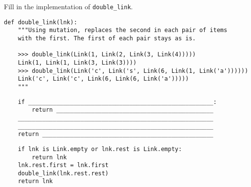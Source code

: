 \begin{blocksection}
\question Fill in the implementation of \lstinline$double_link$.

\begin{lstlisting}
def double_link(lnk):
    """Using mutation, replaces the second in each pair of items
    with the first. The first of each pair stays as is.

    >>> double_link(Link(1, Link(2, Link(3, Link(4)))))
    Link(1, Link(1, Link(3, Link(3))))
    >>> double_link(Link('c', Link('s', Link(6, Link(1, Link('a'))))))
    Link('c', Link('c', Link(6, Link(6, Link('a')))))
    """
\end{lstlisting}

\ifprintanswers\else
\begin{lstlisting}
    if _____________________________________________________:
        return _____________________________________________
    ________________________________________________________
    ________________________________________________________
    return _________________________________________________
\end{lstlisting}
\fi

\begin{solution}
\begin{lstlisting}
    if lnk is Link.empty or lnk.rest is Link.empty:
        return lnk
    lnk.rest.first = lnk.first
    double_link(lnk.rest.rest)
    return lnk
\end{lstlisting}
\end{solution}
\end{blocksection}
